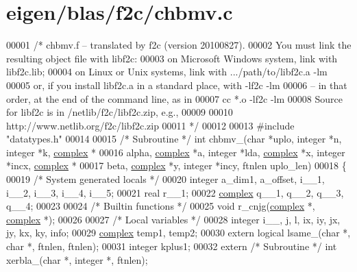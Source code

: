 \hypertarget{eigen_2blas_2f2c_2chbmv_8c_source}{}\section{eigen/blas/f2c/chbmv.c}
\label{eigen_2blas_2f2c_2chbmv_8c_source}

\begin{DoxyCode}
00001 \textcolor{comment}{/* chbmv.f -- translated by f2c (version 20100827).}
00002 \textcolor{comment}{   You must link the resulting object file with libf2c:}
00003 \textcolor{comment}{    on Microsoft Windows system, link with libf2c.lib;}
00004 \textcolor{comment}{    on Linux or Unix systems, link with .../path/to/libf2c.a -lm}
00005 \textcolor{comment}{    or, if you install libf2c.a in a standard place, with -lf2c -lm}
00006 \textcolor{comment}{    -- in that order, at the end of the command line, as in}
00007 \textcolor{comment}{        cc *.o -lf2c -lm}
00008 \textcolor{comment}{    Source for libf2c is in /netlib/f2c/libf2c.zip, e.g.,}
00009 \textcolor{comment}{}
00010 \textcolor{comment}{        http://www.netlib.org/f2c/libf2c.zip}
00011 \textcolor{comment}{*/}
00012 
00013 \textcolor{preprocessor}{#include "datatypes.h"}
00014 
00015 \textcolor{comment}{/* Subroutine */} \textcolor{keywordtype}{int} chbmv\_(\textcolor{keywordtype}{char} *uplo, integer *n, integer *k, \hyperlink{structcomplex}{complex} *
00016     alpha, \hyperlink{structcomplex}{complex} *a, integer *lda, \hyperlink{structcomplex}{complex} *x, integer *incx, 
      \hyperlink{structcomplex}{complex} *
00017     beta, \hyperlink{structcomplex}{complex} *y, integer *incy, ftnlen uplo\_len)
00018 \{
00019     \textcolor{comment}{/* System generated locals */}
00020     integer a\_dim1, a\_offset, i\_\_1, i\_\_2, i\_\_3, i\_\_4, i\_\_5;
00021     real r\_\_1;
00022     \hyperlink{structcomplex}{complex} q\_\_1, q\_\_2, q\_\_3, q\_\_4;
00023 
00024     \textcolor{comment}{/* Builtin functions */}
00025     \textcolor{keywordtype}{void} r\_cnjg(\hyperlink{structcomplex}{complex} *, \hyperlink{structcomplex}{complex} *);
00026 
00027     \textcolor{comment}{/* Local variables */}
00028     integer i\_\_, j, l, ix, iy, jx, jy, kx, ky, info;
00029     \hyperlink{structcomplex}{complex} temp1, temp2;
00030     \textcolor{keyword}{extern} logical lsame\_(\textcolor{keywordtype}{char} *, \textcolor{keywordtype}{char} *, ftnlen, ftnlen);
00031     integer kplus1;
00032     \textcolor{keyword}{extern} \textcolor{comment}{/* Subroutine */} \textcolor{keywordtype}{int} xerbla\_(\textcolor{keywordtype}{char} *, integer *, ftnlen);

\end{DoxyCode}
